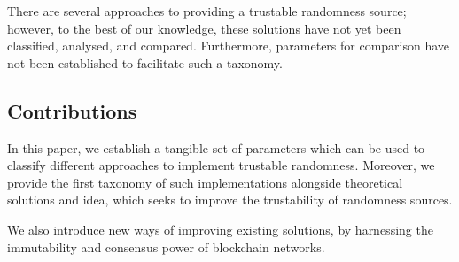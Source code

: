 There are several approaches to providing a trustable randomness source; however, to the best of our knowledge, these solutions have not yet been classified, analysed, and compared.
Furthermore, parameters for comparison have not been established to facilitate such a taxonomy.

\subsection*{Contributions}\label{subsec:contributions}
In this paper, we establish a tangible set of parameters which can be used to classify different approaches to implement trustable randomness.
Moreover, we provide the first taxonomy of such implementations alongside theoretical solutions and idea, which seeks to improve the trustability of randomness sources.

We also introduce new ways of improving existing solutions, by harnessing the immutability and consensus power of blockchain networks.




